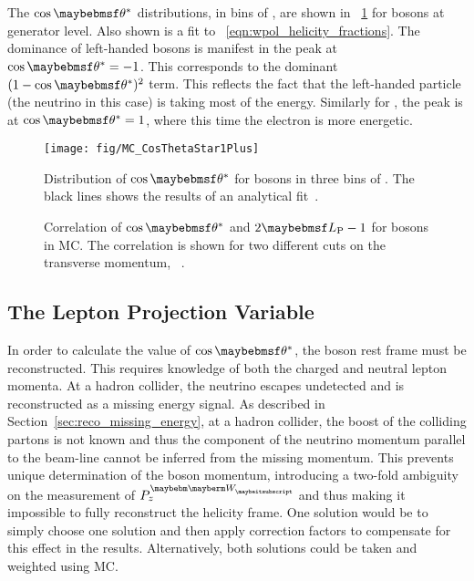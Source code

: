 The $\cos\thetastar$ distributions, in bins of \PtW, are shown in
\fig~\ref{fig:wpol_costheta} for \PWp bosons at generator level. Also shown is a
fit to \eqn~\ref{eqn:wpol_helicity_fractions}. The dominance of left-handed \PW
bosons is manifest in the peak at $\cos\thetastar = -1$. This corresponds to the
dominant $(1-\cos\thetastar)^2$ term. This reflects the fact that the
left-handed particle (the neutrino in this case) is taking most of the
energy. Similarly for \PWm, the peak is at $\cos\thetastar = 1$, where this time
the electron is more energetic.

\begin{figure}[h!]
\centering
\texttt{[image: fig/MC\_CosThetaStar1Plus]}
\caption[Distribution of $\cos\thetastar$ for \PWp bosons in three bins of
\PtW.]{Distribution of $\cos\thetastar$ for \PWp bosons in three bins of \PtW. The black lines shows the results of an analytical fit~\cite{wpol_an}.}
\label{fig:wpol_costheta}
\end{figure}

\begin{figure}[h!]
\centering
{}\quad
\subfloat[[$\PtW > \unit{400}{\GeV}$]{
  \label{fig:wpol_costheta_corr400}\texttt{[image: fig/LP\_corr400]}}\quad
\caption[Correlation of $\cos\thetastar$ and $2\LP - 1$ for \PW bosons in
\ac{MC}]{Correlation of $\cos\thetastar$ and $2\LP - 1$ for \PW bosons in
  \ac{MC}. The correlation is shown for two different cuts on the transverse
  momentum, \PtW~\cite{wpol_an}.}
\label{fig:wpol_costheta_corr}
\end{figure}

\subsection{The Lepton Projection Variable}
\label{sec:wpol_lp}
In order to calculate the value of $\cos\thetastar$, the \PW boson rest frame
must be reconstructed. This requires knowledge of both the charged and neutral
lepton momenta. At a hadron collider, the neutrino escapes undetected and is
reconstructed as a missing energy signal. As described in
Section~\ref{sec:reco_missing_energy}, at a hadron collider, the boost of the
colliding partons is not known and thus the component of the neutrino momentum
parallel to the beam-line cannot be inferred from the missing momentum. This
prevents unique determination of the \PW boson momentum, introducing a two-fold
ambiguity on the measurement of $P^{\PW}_z$ and thus making it impossible to
fully reconstruct the helicity frame. One solution would be to simply choose one
solution and then apply correction factors to compensate for this effect in the
results. Alternatively, both solutions could be taken and weighted using \ac{MC}.

